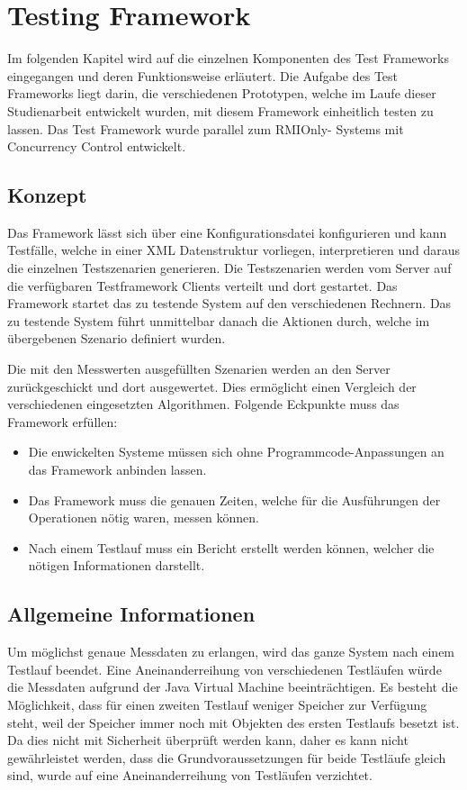 \chapter{Testing Framework}
Im folgenden Kapitel wird auf die einzelnen Komponenten des Test Frameworks eingegangen und deren Funktionsweise erläutert. Die Aufgabe des Test Frameworks liegt darin, die verschiedenen Prototypen, welche im Laufe dieser Studienarbeit entwickelt wurden, mit diesem Framework einheitlich testen zu lassen. Das Test Framework wurde parallel zum RMIOnly- Systems mit Concurrency Control entwickelt.

\section{Konzept}
Das Framework lässt sich über eine Konfigurationsdatei konfigurieren und kann Testfälle, welche in einer XML Datenstruktur vorliegen, interpretieren und daraus die einzelnen Testszenarien generieren. Die Testszenarien werden vom Server auf die verfügbaren Testframework Clients verteilt und dort gestartet. Das Framework startet das zu testende System auf den verschiedenen Rechnern. Das zu testende System führt unmittelbar danach die Aktionen durch, welche im übergebenen Szenario definiert wurden.

Die mit den Messwerten ausgefüllten Szenarien werden an den Server zurück\-geschickt und dort ausgewertet. Dies ermöglicht einen Vergleich der verschiedenen eingesetzten Algorithmen. Folgende Eckpunkte muss das Framework erfüllen:

\begin{itemize}
\item Die enwickelten Sys\-te\-me müssen sich ohne Programmcode-Anpassungen an das Framework anbinden lassen.
\item Das Framework muss die genauen Zeiten, welche für die Ausführungen der Operationen nötig waren, messen können.
\item Nach einem Testlauf muss ein Bericht erstellt werden können, welcher die nötigen Informationen darstellt.
\end{itemize}

\section{Allgemeine Informationen}
\label{sec:allgInformationen}

Um möglichst genaue Messdaten zu erlangen, wird das ganze System nach einem Testlauf beendet. Eine Aneinanderreihung von verschiedenen Test\-läufen würde die Messdaten aufgrund der Java Virtual Machine be\-ein\-träch\-ti\-gen. Es besteht die Möglichkeit, dass für einen zweiten Testlauf weniger Speicher zur Verfügung steht, weil der Speicher immer noch mit Objekten des ersten Testlaufs besetzt ist. Da dies nicht mit Sicherheit überprüft werden kann, daher es kann nicht gewährleistet werden, dass die Grundvoraussetzungen für beide Testläufe gleich sind, wurde auf eine Aneinanderreihung von Testläufen verzichtet.

